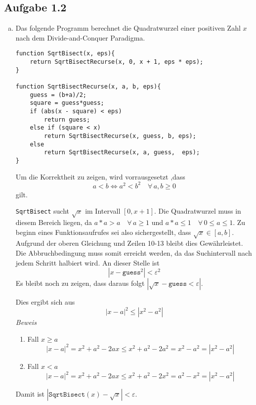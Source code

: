\documentclass[11pt]{article}
\newcommand{\abs}[1]{\left| #1 \right| }
\begin{document}
\subsection*{Aufgabe 1.2}
\begin{enumerate}[a)]
  \item 
    Das folgende Programm berechnet die Quadratwurzel einer positiven 
    Zahl $x$ nach dem Divide-and-Conquer Paradigma. 


    \begin{lstlisting}
function SqrtBisect(x, eps){
    return SqrtBisectRecurse(x, 0, x + 1, eps * eps);
}

function SqrtBisectRecurse(x, a, b, eps){
    guess = (b+a)/2;
    square = guess*guess;
    if (abs(x - square) < eps)
        return guess;
    else if (square < x)
        return SqrtBisectRecurse(x, guess, b, eps);
    else
        return SqrtBisectRecurse(x, a, guess,  eps);
}
  \end{lstlisting}

  Um die Korrektheit zu zeigen, wird vorrausgesetzt ,dass  
  \begin{equation}
    a < b \iff a^2 < b^2 \quad\forall\, a, b \ge 0
  \end{equation}
  gilt.

  \texttt{SqrtBisect} sucht $\sqrt{x}$ im Intervall $[0,x+1]$. Die Quadratwurzel
  muss in diesem Bereich liegen, da $a * a > a \quad\forall\, a \ge 1 $ und
  $a * a \le 1 \quad\forall\, 0 \le a \le 1$.
  Zu beginn eines Funktionsaufrufes sei also sichergestellt, dass $\sqrt{x} \in
  [a,b]$.  Aufgrund der oberen Gleichung und Zeilen 10-13 bleibt dies
  Gew\"ahrleistet. Die Abbruchbedingung muss somit erreicht werden, da das
  Suchintervall nach jedem Schritt halbiert wird. An dieser Stelle ist
  \begin{equation}
  | x - \texttt{guess}^2 | < \varepsilon^2
  \end{equation}
  Es bleibt noch zu zeigen, dass daraus folgt $\left| \sqrt{x} - \texttt{guess}
  < \varepsilon \right|$.

  Dies ergibt sich aus \[ \left| x-a \right|^2 \le \left| x^2 - a^2 \right|  \]  
  \emph{Beweis} 
  \begin{enumerate}
    \item Fall $x \ge a$
      \[ \abs{x-a}^2 = x^2 + a^2 - 2 ax \le x^2 + a^2 - 2 a^2 = x^2 -a^2 =
      \abs{x^2-a^2}  \] 
    \item Fall $x < a$
      \[ \abs{x-a}^2 = x^2 + a^2 - 2 ax \le x^2 + a^2 - 2 x^2 = a^2 -x^2 =
      \abs{x^2-a^2}  \] 
  \end{enumerate}
  Damit ist $\abs{ \texttt{SqrtBisect}(x)- \sqrt{x} } < \varepsilon$.



\end{enumerate}
\end{document}
